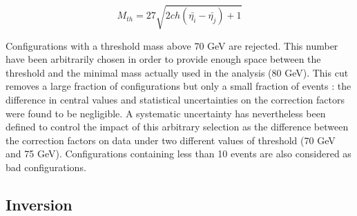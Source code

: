 \begin{equation}
\label{eq:org0ac2b33}
M_{th} = 27\sqrt{2 ch(\bar{\eta_i} - \bar{\eta_j}) + 1 }
\end{equation}

Configurations with a threshold mass above 70 GeV are rejected.
This number have been arbitrarily chosen in order to provide enough space between the threshold and the minimal mass actually used in the analysis (80 GeV).
This cut removes a large fraction of configurations but only a small fraction of events : the difference in central values and statistical uncertainties on the correction factors were found to be negligible.
A systematic uncertainty has nevertheless been defined to control the impact of this arbitrary selection as the difference between the correction factors on data under two different values of threshold (70 GeV and 75 GeV).
Configurations containing less than 10 events are also considered as bad configurations.

\subsection{Inversion}
\label{sec:org4b5e4aa}

